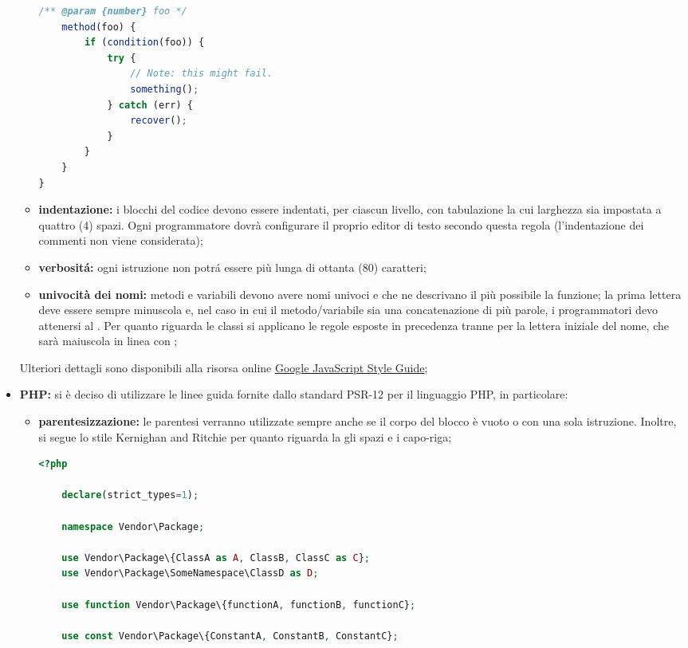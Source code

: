 \begin{itemize}
\begin{itemize}
\begin{lstlisting}[language=JavaScript,captionpos=b,caption={Esempio per la sintassi JavaScript}]
	/** @param {number} foo */
	method(foo) {
		if (condition(foo)) {
			try {
				// Note: this might fail.
				something();
			} catch (err) {
				recover();
			}
		}
	}
}
								\end{lstlisting}
								\item \textbf{indentazione:} i blocchi del codice devono essere indentati, per ciascun livello, con tabulazione la cui larghezza sia impostata a quattro (4) spazi. Ogni programmatore dovrà configurare il proprio editor di testo secondo questa regola (l'indentazione dei commenti non viene considerata);
								\item \textbf{verbositá:} ogni istruzione non potrá essere più lunga di ottanta (80) caratteri;
								\item \textbf{univocità dei nomi:} metodi e variabili devono avere nomi univoci e che ne descrivano il più possibile la funzione; la prima lettera deve essere sempre minuscola e, nel caso in cui il metodo/variabile sia una concatenazione di più parole, i programmatori devo attenersi al .
								Per quanto riguarda le classi si applicano le regole esposte in precedenza tranne per la lettera iniziale del nome, che sarà maiuscola in linea con ;
							\end{itemize}
							Ulteriori dettagli sono disponibili alla risorsa online \href{https://google.github.io/styleguide/jsguide.html}{Google JavaScript Style Guide};
						\item \textbf{PHP:} si è deciso di utilizzare le linee guida fornite dallo standard PSR-12 per il linguaggio PHP, in particolare:
							\begin{itemize}
								\item \textbf{parentesizzazione:} le parentesi verranno utilizzate sempre anche se il corpo del blocco è vuoto o con una sola istruzione. Inoltre, si segue lo stile Kernighan and Ritchie per quanto riguarda la gli spazi e i capo-riga;
								\begin{lstlisting}[language=php,captionpos=b,caption={Esempio per la sintassi PHP}]
<?php

	declare(strict_types=1);

	namespace Vendor\Package;

	use Vendor\Package\{ClassA as A, ClassB, ClassC as C};
	use Vendor\Package\SomeNamespace\ClassD as D;

	use function Vendor\Package\{functionA, functionB, functionC};

	use const Vendor\Package\{ConstantA, ConstantB, ConstantC};


\end{lstlisting}
\end{itemize}
\end{itemize}
